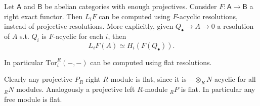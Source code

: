 \begin{prop}
	Let $\mathsf{A}$ and $\mathsf{B}$ be abelian categories with enough projectives.
	Consider $F\colon\mathsf{A} \to \mathsf{B}$ a right exact functor.
	Then $L_iF$ can be computed using $F$-acyclic resolutions, instead of projective resolutions.
	More explicitly, given
	$Q_{\bullet} \to A \to 0$ a resolution of $A$ s.t. $Q_i$ is $F$-acyclic for each $i$, then
	\begin{equation}
		L_iF(A) \simeq H_i \left( F(Q_{\bullet}) \right)
	.\end{equation} 
\end{prop} 

\begin{rem}[]
	In particular $\mathrm{Tor}_i^R(-,-)$ can be computed using flat resolutions.
\end{rem}

\begin{rem}
	Clearly any projective $P_R$ right $R$-module is flat, since it is $- \otimes_R N$-acyclic for
	all ${}_RN$ modules.
	Analogously a projective left $R$-module ${}_RP$ is flat.
	In particular any free module is flat.
\end{rem}

